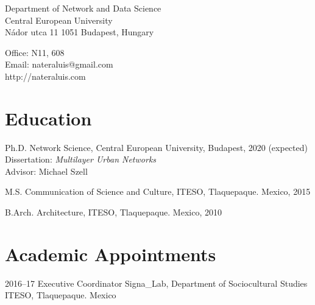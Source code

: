 \documentclass{academiccv}
\begin{document}
\raggedright

\namefont{\myname}

\vspace{1em}
\begin{minipage}[t]{0.495\textwidth}
  Department of Network and Data Science \\
  Central European University \\
  Nádor utca 11
  1051 Budapest, Hungary
\end{minipage}
\begin{minipage}[t]{0.495\textwidth}
  Office: N11, 608 \\
  Email: nateraluis@gmail.com \\
  http://nateraluis.com \\
\end{minipage}
\vspace{0.5em}



\section*{Education}

\begin{tablist}
	
\item[Ph.D. ] \tab Network Science, Central European University, Budapest, 2020 (expected) \\
                  Dissertation: \textit{Multilayer Urban Networks} \\
                  Advisor: Michael Szell
                  
\item[M.S.]  \tab Communication of Science and Culture, ITESO, Tlaquepaque. Mexico, 2015

\item[B.Arch.]  \tab Architecture,  ITESO, Tlaquepaque. Mexico, 2010

\end{tablist}



\section*{Academic Appointments}

\begin{tablist}                     

\item[2016--17] \tab Executive Coordinator Signa\_Lab, Department of Sociocultural Studies \\
                ITESO, Tlaquepaque. Mexico


\end{tablist}
\end{document}
